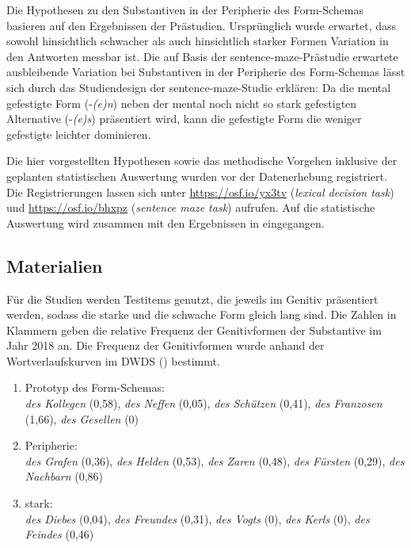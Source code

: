 Die Hypothesen zu den Substantiven in der Peripherie des Form-Schemas basieren auf den Ergebnissen der Prästudien. Ursprünglich wurde erwartet, dass sowohl hinsichtlich schwacher als auch hinsichtlich starker Formen Variation in den Antworten messbar ist. Die auf Basis der sentence-maze-Prästudie erwartete ausbleibende Variation bei Substantiven in der Peripherie des Form-Schemas  lässt sich durch das Studiendesign der sentence-maze-Studie erklären:  Da die mental gefestigte Form (-\textit{(e)n}) neben der mental noch nicht so stark gefestigten Alternative (-\textit{(e)s}) präsentiert wird, kann die gefestigte Form die weniger gefestigte leichter dominieren.

Die hier vorgestellten Hypothesen sowie das methodische Vorgehen inklusive der geplanten statistischen Auswertung wurden vor der Datenerhebung registriert. Die Registrierungen lassen sich unter \url{https://osf.io/yx3tv} (\textit{lexical decision task}) und \url {https://osf.io/bhxpz} (\textit{sentence maze task}) aufrufen. Auf die statistische Auswertung wird zusammen mit den Ergebnissen in  eingegangen.

\subsection{Materialien}
\label{schemalexmaterial}

Für die Studien werden Testitems genutzt, die jeweils im Genitiv präsentiert werden, sodass die starke und die schwache Form gleich lang sind. Die Zahlen in Klammern geben die relative Frequenz der Genitivformen der Substantive im Jahr 2018 an. Die Frequenz der Genitivformen wurde anhand der Wortverlaufskurven im DWDS (\cite{BerlinBrandenburgischeAkademiederWissenschaften.2019}) bestimmt.

\begin{enumerate}
\item Prototyp des Form-Schemas:\\ 
\textit{des Kollegen} (0,58), \textit{des Neffen} (0,05), \textit{des Schützen} (0,41), \textit{des Franzosen} (1,66), \textit{des Gesellen} (0)
\item Peripherie:\\ 
\textit{des Grafen} (0,36), \textit{des Helden} (0,53), \textit{des Zaren} (0,48), \textit{des Fürsten} (0,29), \textit{des Nachbarn} (0,86)
\item stark:\\ 
\textit{des Diebes} (0,04), \textit{des Freundes} (0,31), \textit{des Vogts} (0), \textit{des Kerls} (0), \textit{des Feindes} (0,46)
\end{enumerate}


